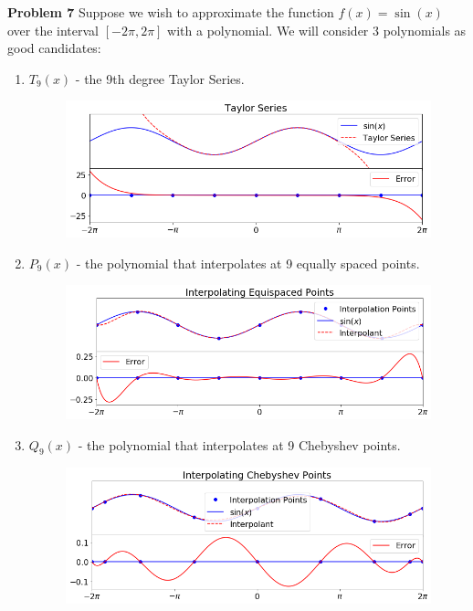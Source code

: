 \documentclass[12pt]{article}
\newcommand{\problem}[1]{\hspace{-4 ex} \large \textbf{Problem #1} }
\begin{document}
\pagebreak
\problem{7} Suppose we wish to approximate the function $f(x) = \sin(x)$ over the interval $[-2\pi,2\pi]$ with a polynomial. We will consider 3 polynomials as good candidates: 
\begin{enumerate}
	\item $T_9(x)$ - the 9th degree Taylor Series.
	\begin{figure}[H]
		\includegraphics[width=1\textwidth]{taylor}
		\centering
	\end{figure}
	\item $P_9(x)$ - the polynomial that interpolates at 9 equally spaced points.
	\begin{figure}[H]
		\includegraphics[width=1\textwidth]{equispaced}
		\centering
	\end{figure}
	\item $Q_9(x)$ - the polynomial that interpolates at 9 Chebyshev points.
	\begin{figure}[H]
		\includegraphics[width=1\textwidth]{chebyshev}
		\centering
	\end{figure}
\end{enumerate}
\end{document}
